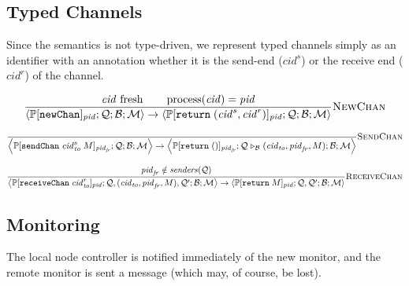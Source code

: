 \documentclass{article}
\newcommand{\sReturn}{\mathtt{return}}
\newcommand{\sNewChan}{\mathtt{newChan}}
\newcommand{\sSendChan}{\mathtt{sendChan}}
\newcommand{\sReceiveChan}{\mathtt{receiveChan}}
\DeclareMathOperator{\sProcessOf}{process}
\newcommand{\sExtend}[1]{\mathrel{\triangleright_{#1}}}
\newcommand{\sPid}{\ensuremath{\mathit{pid}}}
\newcommand{\sCid}{\ensuremath{\mathit{cid}}}
\newcommand{\sSystem}[4]{\left\langle #1 ; #2 ; #3 ; #4 \right\rangle}
\newcommand{\sQueue}{\mathcal{Q}}
\newcommand{\sBlacklist}{\mathcal{B}}
\newcommand{\sMonitors}{\mathcal{M}}
\newcommand{\sCtxt}[1]{\mathbb{#1}}
\newcommand{\sSenders}{\mathit{senders}}
\begin{document}
\subsection{Typed Channels}

Since the semantics is not type-driven, we represent typed channels simply as
an identifier with an annotation whether it is the send-end ($\sCid^s$) or the
receive end ($\sCid^r$) of the channel.

\begin{equation*}
\frac{
  \sCid \text{ fresh}
\qquad
  \sProcessOf(\sCid) = \sPid
}{
  \sSystem{\sCtxt{P}[\sNewChan]_\sPid}
          {\sQueue}
          {\sBlacklist}
          {\sMonitors}
\rightarrow
  \sSystem{\sCtxt{P}[\sReturn \; (\sCid^s, \sCid^r)]_\sPid}
          {\sQueue}
          {\sBlacklist}
          {\sMonitors}
} \textsc{NewChan}
\end{equation*}

\begin{equation*}
\frac{
}{
  \sSystem{\sCtxt{P}[ \sSendChan \; \sCid_\mathit{to}^s \; M ]_{\sPid_\mathit{fr}}}
          {\sQueue}
          {\sBlacklist}
          {\sMonitors}
\rightarrow 
  \sSystem{\sCtxt{P}[ \sReturn \; () ]_{\sPid_\mathit{fr}}}
          {\sQueue \sExtend{\sBlacklist} (\sCid_\mathit{to}, \sPid_\mathit{fr}, M)}
          {\sBlacklist}
          {\sMonitors}
} \textsc{SendChan}
\end{equation*}

\begin{equation*}
\frac{
  \sPid_{\mathit{fr}} \notin \sSenders(\sQueue)
}{
  \sSystem{\sCtxt{P}[ \sReceiveChan \; \sCid_\mathit{to}^r ]_{\sPid}}
          {\sQueue, (\sCid_\mathit{to}, \sPid_\mathit{fr}, M), \sQueue'}
          {\sBlacklist}
          {\sMonitors}
\rightarrow
  \sSystem{\sCtxt{P}[ \sReturn \; M ]_{\sPid}}
          {\sQueue, \sQueue'}
          {\sBlacklist}
          {\sMonitors}
} \textsc{ReceiveChan}
\end{equation*}

\subsection{Monitoring}

The local node controller is notified immediately of the new monitor, and the
remote monitor is sent a message (which may, of course, be lost). 
\end{document}

